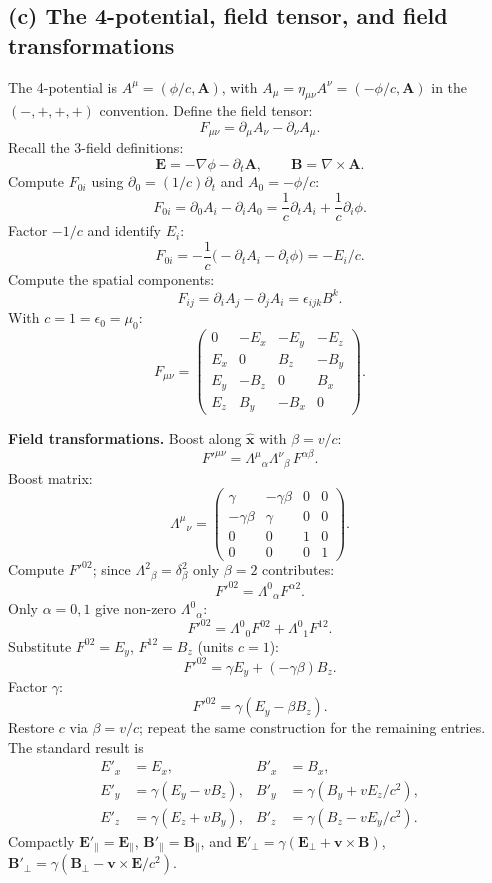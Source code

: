 \documentclass[11pt]{article}
\begin{document}
\subsection*{(c) The 4-potential, field tensor, and field transformations}

The 4-potential is $A^\mu=(\phi/c,\bm A)$, with $A_\mu=\eta_{\mu\nu}A^\nu=(-\phi/c,\bm A)$ in the $(-,+,+,+)$ convention. Define the field tensor:
\[ F_{\mu\nu} = \partial_\mu A_\nu - \partial_\nu A_\mu. \]
Recall the 3-field definitions:
\[ \bm E = -\nabla\phi - \partial_t\bm A,\qquad \bm B = \nabla\times\bm A. \]
Compute $F_{0i}$ using $\partial_0 = (1/c)\partial_t$ and $A_0 = -\phi/c$:
\[ F_{0i} = \partial_0 A_i - \partial_i A_0 = \frac{1}{c}\partial_t A_i + \frac{1}{c}\partial_i\phi. \]
Factor $-1/c$ and identify $E_i$:
\[ F_{0i} = -\frac{1}{c}\bigl(-\partial_t A_i - \partial_i\phi\bigr) = -E_i/c. \]
Compute the spatial components:
\[ F_{ij}=\partial_i A_j - \partial_j A_i = \epsilon_{ijk}B^k. \]
With $c=1=\epsilon_0=\mu_0$:
\begin{equation}
F_{\mu\nu} = \begin{pmatrix} 0 & -E_x & -E_y & -E_z \\ E_x & 0 & B_z & -B_y \\ E_y & -B_z & 0 & B_x \\ E_z & B_y & -B_x & 0 \end{pmatrix}.
\label{eq:Fmunu}
\end{equation}

\textbf{Field transformations.} Boost along $\hat{\bm x}$ with $\beta=v/c$:
\[ F'^{\mu\nu} = \Lambda^\mu{}_\alpha\Lambda^\nu{}_\beta\,F^{\alpha\beta}. \]
Boost matrix:
\[ \Lambda^\mu{}_\nu = \begin{pmatrix}\gamma & -\gamma\beta & 0 & 0\\ -\gamma\beta & \gamma & 0 & 0\\ 0 & 0 & 1 & 0\\ 0 & 0 & 0 & 1\end{pmatrix}. \]
Compute $F'^{02}$; since $\Lambda^2{}_\beta=\delta^2_\beta$ only $\beta=2$ contributes:
\[ F'^{02} = \Lambda^0{}_\alpha F^{\alpha 2}. \]
Only $\alpha=0,1$ give non-zero $\Lambda^0{}_\alpha$:
\[ F'^{02} = \Lambda^0{}_0 F^{02} + \Lambda^0{}_1 F^{12}. \]
Substitute $F^{02}=E_y$, $F^{12}=B_z$ (units $c=1$):
\[ F'^{02} = \gamma E_y + (-\gamma\beta) B_z. \]
Factor $\gamma$:
\[ F'^{02} = \gamma(E_y - \beta B_z). \]
Restore $c$ via $\beta=v/c$; repeat the same construction for the remaining entries. The standard result is
\begin{equation}
\boxed{
\begin{aligned}
E'_x &= E_x, & B'_x &= B_x,\\
E'_y &= \gamma(E_y - v B_z), & B'_y &= \gamma(B_y + v E_z/c^2),\\
E'_z &= \gamma(E_z + v B_y), & B'_z &= \gamma(B_z - v E_y/c^2).
\end{aligned}}
\end{equation}
Compactly $\bm E'_\parallel=\bm E_\parallel$, $\bm B'_\parallel=\bm B_\parallel$, and $\bm E'_\perp=\gamma(\bm E_\perp+\bm v\times\bm B)$, $\bm B'_\perp=\gamma(\bm B_\perp-\bm v\times\bm E/c^2)$.
\end{document}
